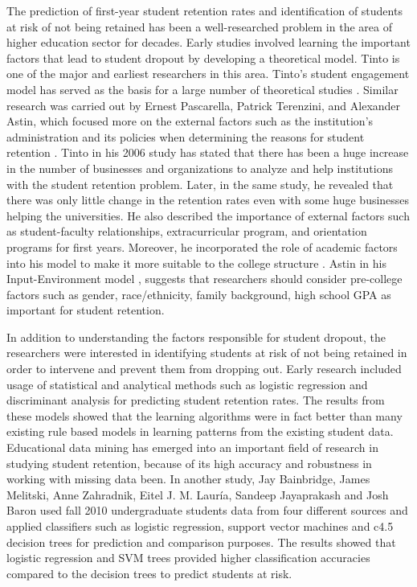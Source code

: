 \documentclass[11pt,openright]{report}
\begin{document}
The prediction of first-year student retention rates and identification of students at risk of not being retained has been a well-researched problem in the area of higher education sector for decades. Early studies involved learning the important factors that lead to student dropout by developing a theoretical model. Tinto is one of the major and earliest researchers in this area. Tinto's student engagement model \cite{tinto1999taking} has served as the basis for a large number of theoretical studies \cite{braxton2002introduction}. Similar research was carried out by Ernest Pascarella, Patrick Terenzini, and Alexander Astin, which focused more on the external factors such as the institution's administration and its policies when determining the reasons for student retention \cite{astin2012assessment}. Tinto in his 2006 study \cite{tinto2006} has stated that there has been a huge increase in the number of businesses and organizations to analyze and help institutions with the student retention problem. Later, in the same study, he revealed that there was only little change in the retention rates even with some huge businesses helping the universities. He also described the importance of external factors such as student-faculty relationships, extracurricular program, and orientation programs for first years. Moreover, he incorporated the role of academic factors into his model to make it more suitable to the college structure \cite{tinto2006}. Astin in his Input-Environment model \cite{astin2012assessment}, suggests that researchers should consider pre-college factors such as gender, race/ethnicity, family background, high school GPA  as important for student retention.

In addition to understanding the factors responsible for student dropout, the researchers were interested in identifying students at risk of not being retained in order to intervene and prevent them from dropping out. Early research included usage of statistical and analytical methods such as logistic regression and discriminant analysis for predicting student retention rates\cite{lakkaraju2015machine,marbouti2016models,adejo2017}. The results from these models showed that the learning algorithms were in fact better than many existing rule based models in learning patterns from the existing student data. Educational data mining has emerged into an important field of research in studying student retention, because of its high accuracy and robustness in working with missing data been\cite{alkhasawneh2014developing}. In another study, Jay Bainbridge, James Melitski, Anne Zahradnik, Eitel J. M. Lauría, Sandeep Jayaprakash and Josh Baron used fall 2010 undergraduate students data from four different sources and applied classifiers such as logistic regression, support vector machines and c4.5 decision trees for prediction and comparison purposes\cite{bainbridge2015}. The results showed that logistic regression and SVM trees provided higher classification accuracies compared to the decision trees to predict students at risk. 
\end{document}
